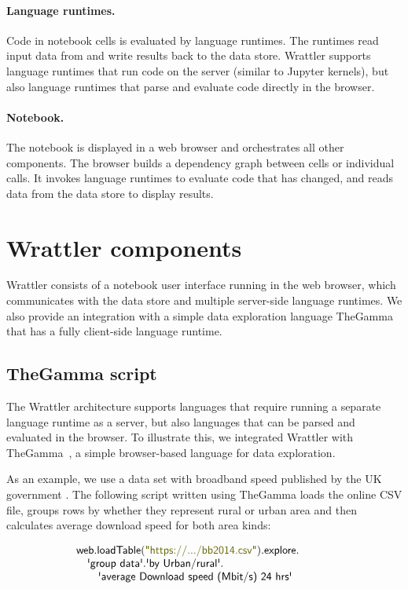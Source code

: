 \documentclass[sigplan]{acmart}\settopmatter{printfolios=true,printccs=false,printacmref=false}
\begin{document}
\paragraph{Language runtimes.} Code in notebook cells is evaluated by language runtimes.
The runtimes read input data from and write results back to the data store. Wrattler supports
language runtimes that run code on the server (similar to Jupyter kernels), but also language
runtimes that parse and evaluate code directly in the browser.

\paragraph{Notebook.} The notebook is displayed in a web browser and orchestrates 
all other components. The browser builds a dependency graph between cells or individual 
calls. It invokes language runtimes to evaluate code that has changed,
and reads data from the data store to display results.  

\section{Wrattler components}
\label{sec:comp}

Wrattler consists of a notebook user interface running in the web browser, which communicates 
with the data store and multiple server-side language runtimes. We also provide an integration 
with a simple data exploration language TheGamma \cite{thegamma} that has a fully client-side language
runtime. 

\subsection{TheGamma script}
\label{sec:comp-gamma}

The Wrattler architecture supports languages that require running a separate language runtime
as a server, but also languages that can be parsed and evaluated in the browser. To illustrate this, 
we integrated Wrattler with TheGamma~\cite{thegamma}, a simple browser-based language 
for data exploration.

As an example, we use a data set with broadband speed published by the UK government \cite{ofcom}.
The following script written using TheGamma loads the online CSV file, groups rows by whether they represent
rural or urban area and then calculates average download speed for both area kinds:

\noindent
\begin{equation*}
\hspace{-3em}
\begin{array}{l}
\ident{web.loadTable}(\str{https://.../bb2014.csv}).\ident{explore}.\\
\quad\qident{group data}.\qident{by Urban/rural}.\\
\qquad\qident{average Download speed (Mbit/s) 24 hrs}  
\end{array}
\end{equation*}
\end{document}
